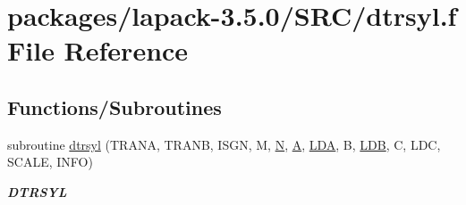 \hypertarget{dtrsyl_8f}{}\section{packages/lapack-\/3.5.0/\+S\+R\+C/dtrsyl.f File Reference}
\label{dtrsyl_8f}
\subsection*{Functions/\+Subroutines}
\begin{DoxyCompactItemize}
\item 
subroutine \hyperlink{group__doubleSYcomputational_ga8ea8dcc931c1ae67b98251b3a8f8cac9}{dtrsyl} (T\+R\+A\+N\+A, T\+R\+A\+N\+B, I\+S\+G\+N, M, \hyperlink{polmisc_8c_a0240ac851181b84ac374872dc5434ee4}{N}, \hyperlink{classA}{A}, \hyperlink{example__user_8c_ae946da542ce0db94dced19b2ecefd1aa}{L\+D\+A}, B, \hyperlink{example__user_8c_a50e90a7104df172b5a89a06c47fcca04}{L\+D\+B}, C, L\+D\+C, S\+C\+A\+L\+E, I\+N\+F\+O)
\begin{DoxyCompactList}\small\item\em {\bfseries D\+T\+R\+S\+Y\+L} \end{DoxyCompactList}\end{DoxyCompactItemize}
